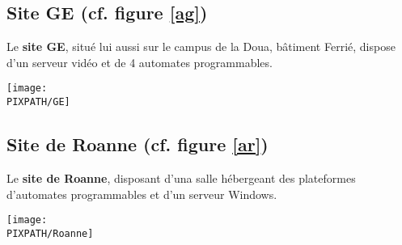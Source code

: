 \subsection{Site GE (cf. figure \ref{ag})}

Le {\bf site GE}, situé lui aussi sur le campus de la Doua, bâtiment
        Ferrié, dispose d'un serveur vidéo et de 4 automates programmables.

\begin{center}
\begin{sidewaysfigure}[!h]
    \texttt{[image: \\PIXPATH/GE]}
    \caption{Architecture du site GE}
    \label{ag}
\end{sidewaysfigure}
\end{center}

\subsection{Site de Roanne (cf. figure \ref{ar})}

Le {\bf site de Roanne}, disposant d'una salle hébergeant des plateformes
        d'automates programmables et d'un serveur Windows.

\begin{center}
\begin{sidewaysfigure}[!h]
    \texttt{[image: \\PIXPATH/Roanne]}
    \caption{Architecture du site de Roanne}
    \label{ar}
\end{sidewaysfigure}
\end{center}

\FloatBarrier

